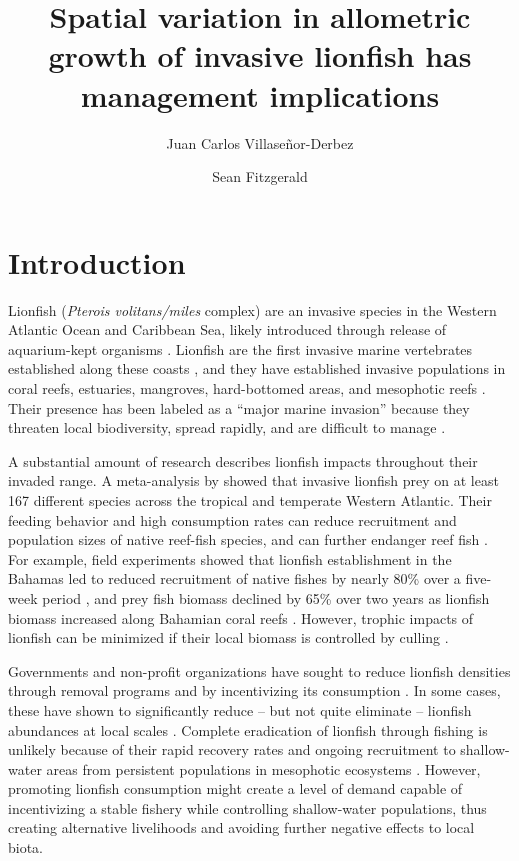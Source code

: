 \documentclass[fleqn,10pt,lineno]{wlpeerj} %
\title{Spatial variation in allometric growth of invasive lionfish has
management implications}
\author[1]{Juan Carlos Villaseñor-Derbez}
\author[1]{Sean Fitzgerald}
\affil[1]{Bren School of Environmental Sciences and Management, University of California
  Santa Barbara, Santa Barbara, California, USA}
\begin{document}
\flushbottom
\maketitle
\thispagestyle{empty}

\section*{Introduction}

Lionfish (\emph{Pterois volitans/miles} complex) are an invasive species
in the Western Atlantic Ocean and Caribbean Sea, likely introduced
through release of aquarium-kept organisms \citep{betancurr_2011}.
Lionfish are the first invasive marine vertebrates established along
these coasts \citep{schofield_2009,schofield_2010,sabidoitza_2016}, and
they have established invasive populations in coral reefs, estuaries,
mangroves, hard-bottomed areas, and mesophotic reefs
\citep{barbour_2010,jud_2011,muoz_2011,claydon_2012,andradibrown_2017,gress_2017}.
Their presence has been labeled as a ``major marine invasion'' because
they threaten local biodiversity, spread rapidly, and are difficult to
manage \citep{hixon_2016}.

A substantial amount of research describes lionfish impacts throughout
their invaded range. A meta-analysis by \citet{peake_2018} showed that
invasive lionfish prey on at least 167 different species across the
tropical and temperate Western Atlantic. Their feeding behavior and high
consumption rates can reduce recruitment and population sizes of native
reef-fish species, and can further endanger reef fish
\citep[][but see \citealt{hackerott_2017} for a counterexample]{green_2012,rocha_2015}.
For example, field experiments showed that lionfish establishment in the
Bahamas led to reduced recruitment of native fishes by nearly 80\% over
a five-week period \citep{albins_2008}, and prey fish biomass declined
by 65\% over two years as lionfish biomass increased along Bahamian
coral reefs \citep{green_2012}. However, trophic impacts of lionfish can
be minimized if their local biomass is controlled by culling
\citep{ariasgonzalez_2011}.

Governments and non-profit organizations have sought to reduce lionfish
densities through removal programs and by incentivizing its consumption
\citep{chin_2016}. In some cases, these have shown to significantly
reduce -- but not quite eliminate -- lionfish abundances at local scales
\citep{deleon_2013,sandel_2015}. Complete eradication of lionfish
through fishing is unlikely because of their rapid recovery rates and
ongoing recruitment to shallow-water areas from persistent populations
in mesophotic ecosystems \citep{barbour_2011,andradibrown_2017}.
However, promoting lionfish consumption might create a level of demand
capable of incentivizing a stable fishery while controlling
shallow-water populations, thus creating alternative livelihoods and
avoiding further negative effects to local biota.
\end{document}
